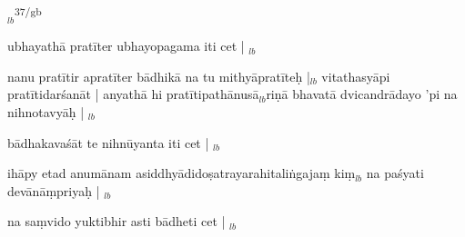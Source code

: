 \documentclass[article,12pt,a4paper]{memoir}%
\newcounter{parCount}
\begin{document}
	{}
	\pend%
      {\tiny $_{lb}$}\textsuperscript{\textenglish{37/gb}}

	  
	  \pstart \leavevmode%
	ubhayathā pratīter ubhayopagama iti cet |
	{}
	\pend%
      {\tiny $_{lb}$}

	  
	  \pstart \leavevmode%
	nanu pratītir apratīter bādhikā na tu mithyāpratīteḥ |{\tiny $_{lb}$} vitathasyāpi pratītidarśanāt | anyathā hi pratītipathānusā{\tiny $_{lb}$}riṇā bhavatā dvicandrādayo 'pi na nihnotavyāḥ |
	{}
	\pend%
      {\tiny $_{lb}$}

	  
	  \pstart \leavevmode%
	bādhakavaśāt te nihnūyanta iti cet |
	{}
	\pend%
      {\tiny $_{lb}$}

	  
	  \pstart \leavevmode%
	ihāpy etad anumānam asiddhyādidoṣatrayarahitaliṅgajaṃ kiṃ{\tiny $_{lb}$} na paśyati devānāṃpriyaḥ |
	{}
	\pend%
      {\tiny $_{lb}$}

	  
	  \pstart \leavevmode%
	na saṃvido yuktibhir asti bādheti cet |
	{}
	\pend%
      {\tiny $_{lb}$}
\end{document}
